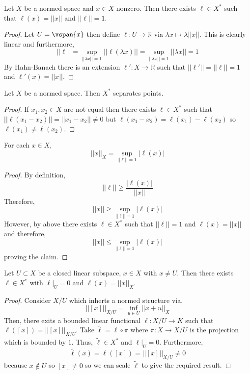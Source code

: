 \documentclass[12pt]{article}
\newcommand{\R}{\mathbb{R}}
\begin{document}
\begin{cor}
Let $X$ be a normed space and $x \in X$ nonzero. Then there exists $\ell \in X^*$ such that $\ell(x) = || x ||$ and $|| \ell || = 1$.
\end{cor}

\begin{proof}
Let $U = \vspan{x}$ then define $\ell : U \to \R$ via $\lambda x \mapsto \lambda || x ||$. This is clearly linear and furthermore,
\[ || \ell || = \sup_{|| \lambda x || = 1 } || \ell(\lambda x) || = \sup_{|| \lambda x || = 1 } || \lambda x ||  =  1 \]
By Hahn-Banach there is an extension $\ell' : X \to \R$ such that $|| \ell' || = || \ell || = 1$ and $\ell'(x) = || x ||$.
\end{proof}

\begin{cor}
Let $X$ be a normed space. Then $X^*$ separates points.
\end{cor}

\begin{proof}
If $x_1, x_2 \in X$ are not equal then there exists $\ell \in X^*$ such that $|| \ell(x_1 - x_2) || = || x_1 - x_2 || \neq 0$ but $\ell(x_1 - x_2) = \ell(x_1) - \ell(x_2)$ so $\ell(x_1) \neq \ell(x_2)$.
\end{proof}

\begin{cor}
For each $x \in X$,
\[ || x ||_X = \sup_{||\ell || = 1}  | \ell(x)|  \]
\end{cor}

\begin{proof}
By definition,
\[ || \ell || \ge \frac{| \ell(x) |}{|| x ||} \]
Therefore, 
\[ || x || \ge \sup_{|| \ell || = 1} | \ell(x) | \]
However, by above there exists $\ell \in X^*$ such that $|| \ell || = 1$ and $\ell(x) = || x ||$ and therefore,
\[ || x || \le \sup_{|| \ell || = 1} | \ell(x) | \]
proving the claim.
\end{proof}

\begin{cor}
Let $U \subset X$ be a closed linear subspace, $x \in X$ with $x \neq U$. Then there exists $\ell \in X^*$ with $\ell |_U = 0$ and $\ell(x) = || x ||_X$.
\end{cor}

\begin{proof}
Consider $X/U$ which inherts a normed structure via,
\[ || [x] ||_{X/U} = \inf_{u \in U} || x + u ||_X \]
Then, there exits a bounded linear functional $\ell : X / U \to K$ such that $\ell([x]) = || [x] ||_{X/U}$. Take $\tilde{\ell} = \ell \circ \pi$ where $\pi : X \to X/U$ is the projection which is bounded by $1$. Thus, $\tilde{\ell} \in X^*$ and $\ell|_U = 0$. Furthermore, 
\[ \tilde{\ell}(x) = \ell([x]) = || [x] ||_{X / U} \neq 0 \]
because $x \notin U$ so $[x] \neq 0$ so we can scale $\tilde{\ell}$ to give the required result.
\end{proof}
\end{document}

